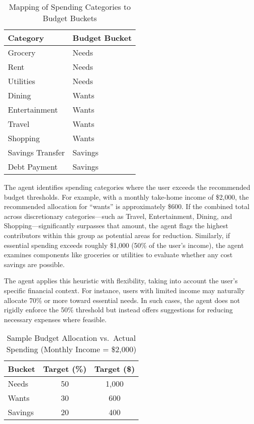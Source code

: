 \documentclass[conference]{IEEEtran}
\begin{document}
\begin{table}[htbp]
\centering
\caption{Mapping of Spending Categories to Budget Buckets}
\label{tab:category_bucket_mapping}
\renewcommand{\arraystretch}{1.3}
\begin{tabular}{|l|l|}
\hline
\textbf{Category} & \textbf{Budget Bucket} \\
\hline
Grocery & Needs \\
\hline
Rent & Needs \\
\hline
Utilities & Needs \\
\hline
Dining & Wants \\
\hline
Entertainment & Wants \\
\hline
Travel & Wants \\
\hline
Shopping & Wants \\
\hline
Savings Transfer & Savings \\
\hline
Debt Payment & Savings \\
\hline
\end{tabular}
\end{table}


The agent identifies spending categories where the user exceeds the recommended budget thresholds. For example, with a monthly take-home income of \$2{,}000, the recommended allocation for “wants” is approximately \$600. If the combined total across discretionary categories—such as Travel, Entertainment, Dining, and Shopping—significantly surpasses that amount, the agent flags the highest contributors within this group as potential areas for reduction. Similarly, if essential spending exceeds roughly \$1{,}000 (50\% of the user’s income), the agent examines components like groceries or utilities to evaluate whether any cost savings are possible.

The agent applies this heuristic with flexibility, taking into account the user’s specific financial context. For instance, users with limited income may naturally allocate 70\% or more toward essential needs. In such cases, the agent does not rigidly enforce the 50\% threshold but instead offers suggestions for reducing necessary expenses where feasible.


\begin{table}[htbp]
\centering
\caption{Sample Budget Allocation vs.\ Actual Spending (Monthly Income = \$2{,}000)}
\label{tab:budget_allocation}
\renewcommand{\arraystretch}{1.3}
\begin{tabular}{|l|c|c|}
\hline
\textbf{Bucket} & \textbf{Target (\%)} & \textbf{Target (\$)} \\
\hline
Needs & 50 & 1{,}000 \\
\hline
Wants & 30 & 600 \\
\hline
Savings & 20 & 400 \\
\hline
\end{tabular}
\end{table}
\end{document}
